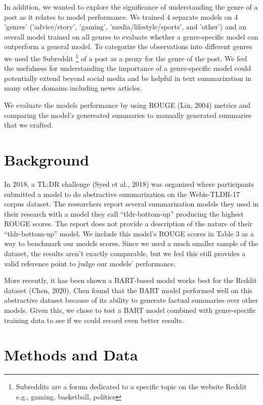 \documentclass[11pt,a4paper, twocolumn]{article}
\begin{document}
In addition, we wanted to explore the significance of understanding the genre of a post as it relates to model performance. We trained 4 separate models on 4 'genres' ('advice/story', 'gaming', 'media/lifestyle/sports', and 'other') and an overall model trained on all genres to evaluate whether a genre-specific model can outperform a general model. To categorize the observations into different genres we used the Subreddit \footnote{Subreddits are a forum dedicated to a specific topic on the website Reddit e.g., gaming, basketball, politics} of a post as a proxy for the genre of the post. We feel the usefulness for understanding the importance of a genre-specific model could potentially extend beyond social media and be helpful in text summarization in many other domains including news articles.

We evaluate the models performance by using ROUGE (Lin, 2004) metrics and comparing the model's genereated summaries to manually generated summaries that we crafted.




\section{Background}
\label{sec:length}

In 2018, a TL;DR challenge (Syed et al., 2018) was organized where participants submitted a model to do abstractive summarization on the Webis-TLDR-17 corpus dataset. The researchers report several summarization models they used in their research with a model they call “tldr-bottom-up” producing the highest ROUGE scores. The report does not provide a description of the nature of their “tldr-bottom-up” model. We include this model’s ROUGE scores in Table 3 as a way to benchmark our models scores. Since we used a much smaller sample of the dataset, the results aren’t exactly comparable, but we feel this still provides a valid reference point to judge our models’ performance.

More recently, it has been shown a BART-based model works best for the Reddit dataset (Chen, 2020). Chen found that the BART model performed well on this abstractive dataset because of its ability to generate factual summaries over other models. Given this, we chose to test a BART model combined with genre-specific training data to see if we could record even better results.

\section{Methods and Data}
\end{document}
